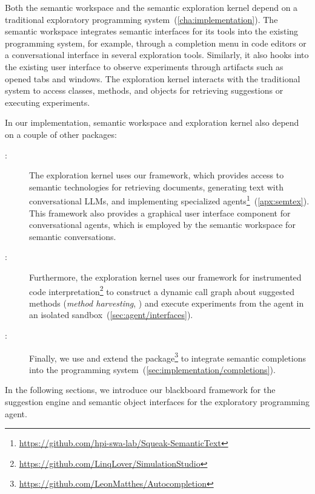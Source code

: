 Both the semantic workspace and the semantic exploration kernel depend on a traditional exploratory programming system~(\cref{cha:implementation}).
The semantic workspace integrates semantic interfaces for its tools into the existing programming system, for example, through a completion menu in code editors or a conversational interface in several exploration tools.
Similarly, it also hooks into the existing user interface to observe experiments through artifacts such as opened tabs and windows.
The exploration kernel interacts with the traditional system to access classes, methods, and objects for retrieving suggestions or executing experiments.

In our implementation, semantic workspace and exploration kernel also depend on a couple of other packages:

\begin{description}
	\item[\semtex:]
	The exploration kernel uses our \semtex framework, which provides access to semantic technologies for retrieving documents, generating text with conversational LLMs, and implementing specialized agents\footnote{\url{https://github.com/hpi-swa-lab/Squeak-SemanticText}}~(\cref{apx:semtex}).
	This framework also provides a graphical user interface component for conversational agents, which is employed by the semantic workspace for semantic conversations.

	\item[:]
	Furthermore, the exploration kernel uses our  framework for instrumented code interpretation\footnote{\url{https://github.com/LinqLover/SimulationStudio}} to construct a dynamic call graph about suggested methods (\emph{method harvesting}, ) and execute experiments from the agent in an isolated sandbox~(\cref{sec:agent/interfaces}).

	\item[:]
	Finally, we use and extend the  package\footnote{\url{https://github.com/LeonMatthes/Autocompletion}} to integrate semantic completions into the programming system~(\cref{sec:implementation/completions}).
\end{description}

In the following sections, we introduce our blackboard framework for the suggestion engine and semantic object interfaces for the exploratory programming agent.
